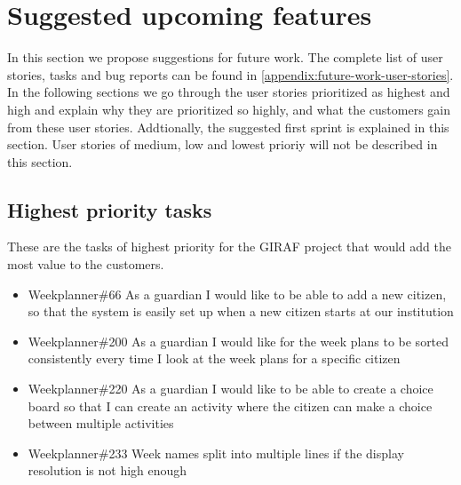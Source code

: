 \section{Suggested upcoming features}
In this section we propose suggestions for future work. 
The complete list of user stories, tasks and bug reports can be found in \autoref{appendix:future-work-user-stories}.
In the following sections we go through the user stories prioritized as highest and high and explain why they are prioritized so highly, and what the customers gain from these user stories.
Addtionally, the suggested first sprint is explained in this section.
User stories of medium, low and lowest prioriy will not be described in this section.

\subsection{Highest priority tasks}\label{highest-priority-tasks}
These are the tasks of highest priority for the GIRAF project that would add the most value to the customers.

\begin{itemize}
    \item Weekplanner\#66 As a guardian I would like to be able to add a new citizen, so that the system is easily set up when a new citizen starts at our institution
    \item Weekplanner\#200 As a guardian I would like for the week plans to be sorted consistently every time I look at the week plans for a specific citizen
    \item Weekplanner\#220 As a guardian I would like to be able to create a choice board so that I can create an activity where the citizen can make a choice between multiple activities 
    \item Weekplanner\#233 Week names split into multiple lines if the display resolution is not high enough 
\end{itemize}

